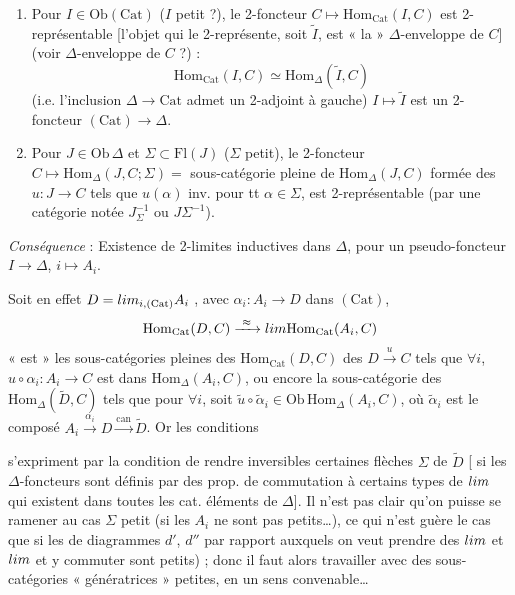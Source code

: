 \documentclass[11pt,a4paper]{article}
\begin{document}
\begin{enumerate}
  \item[(1)] Pour $I \in \mathrm{Ob}(\mathrm{Cat})$ ($I$ petit ?), le
    2-foncteur \struck{\ill{}} $C \mapsto \mathrm{Hom}_{\mathrm{Cat}}(I, C)$
    est 2-représentable [l'objet qui le 2-représente, soit $\tilde{I}$, est
    « la » $\Delta$-enveloppe de $C$] 
    (voir $\Delta$-enveloppe de $C$ ?) :
    \[
      \mathrm{Hom}_{\mathrm{Cat}}(I, C) \simeq \mathrm{Hom}_{\Delta}(\tilde{I}, C)
    \]
    (i.e. l'inclusion $\Delta \to \mathrm{Cat}$ admet un 2-adjoint à
    gauche)  $I \mapsto \tilde{I}$ est un 2-foncteur
    $(\mathrm{Cat}) \to \Delta$.
  \item[(2)] Pour $J \in \mathrm{Ob}\,\Delta$ et $\Sigma \subset
    \mathrm{Fl}(J)$ ($\Sigma$ petit), le 2-foncteur $C \mapsto
    \mathrm{Hom}_{\Delta}(J, C; \Sigma) = $ sous-catégorie pleine de
    $\mathrm{Hom}_{\Delta}(J, C)$ formée des $u : J \to C$ tels que
    $u(\alpha)$ inv. pour tt $\alpha \in \Sigma$, est 2-représentable (par
    une catégorie notée $J^{-1}_{\Sigma}$ ou $J\Sigma^{-1}$).
\end{enumerate}

\emph{Conséquence} : Existence de 2-limites inductives dans $\Delta$,
pour un pseudo-foncteur $I \to \Delta$, $i \mapsto A_{i}$.

Soit en effet $D = \varinjlim_{i, (\mathrm{Cat})} A_{i}$ , avec $\alpha_{i} : A_{i} \to D$ dans $(\mathrm{Cat})$,
 
\[
  \mathrm{Hom}_{\mathrm{Cat}}(D, C) \xrightarrow{\ \approx\ }
  \varprojlim \mathrm{Hom}_{\mathrm{Cat}}(A_{i}, C)
\]
  « est » les sous-catégories pleines des
 $\mathrm{Hom}_{\mathrm{Cat}}(D, C)$  des $D \xrightarrow{u} C$
tels que $\forall i$, $u \circ \alpha_{i} : A_{i} \to C$ est dans
$\mathrm{Hom}_{\Delta}(A_{i}, C)$, \struck{\ill{}} ou encore la
sous-catégorie des $\mathrm{Hom}_{\Delta}(\tilde{D}, C)$  tels que pour $\forall i$, \ill{} soit
$\tilde{u} \circ \tilde{\alpha}_{i} \in \mathrm{Ob}\,\mathrm{Hom}_{\Delta}
(A_{i}, C)$, \ill{} où $\tilde{\alpha}_{i}$ est le composé $A_{i}
\xrightarrow{\alpha_{i}} D \xrightarrow{\mathrm{can}} \tilde{D}$. Or les
conditions

s'expriment par la condition de rendre inversibles certaines flèches
$\Sigma$ de $\tilde{D}$ [ si \ill{} les
$\Delta$-foncteurs sont définis par des prop. de commutation à certains
types de $\varprojlim$ qui existent dans toutes les cat. éléments de
$\Delta$]. Il n'est pas clair qu'on puisse se ramener au cas $\Sigma$
petit (si les $A_{i}$ ne sont pas petits…), ce qui n'est guère le cas
que si les  de diagrammes $d'$, $d''$ par rapport
auxquels on veut prendre des $\varprojlim$ et $\varinjlim$ et y commuter
sont petits) ; donc il faut alors travailler avec des sous-catégories
« génératrices » petites, en un sens convenable…
\end{document}
